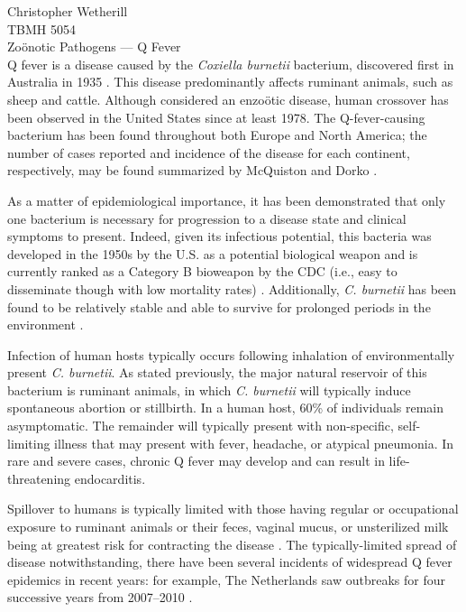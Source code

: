 \documentclass[11pt,letterpaper,final] {article}
\begin{document}

\noindent Christopher Wetherill \\
TBMH 5054 \\
Zo\"{o}notic Pathogens --- Q Fever \\[0.2cm]

Q fever is a disease caused by the \textit{Coxiella burnetii} bacterium, discovered first in Australia in 1935 \cite{Derrick:1937}. This disease predominantly affects ruminant animals, such as sheep and cattle. Although considered an enzo\"{o}tic disease, human crossover has been observed in the United States since at least 1978. The Q-fever-causing bacterium has been found throughout both Europe and North America; the number of cases reported and incidence of the disease for each continent, respectively, may be found summarized by McQuiston \citeyear{McQuiston:2006} and Dorko \citeyear{Dorko:2012}.

As a matter of epidemiological importance, it has been demonstrated that only one bacterium is necessary for progression to a disease state and clinical symptoms to present. Indeed, given its infectious potential, this bacteria was developed in the 1950s by the U.S. as a potential biological weapon and is currently ranked as a Category B bioweapon by the CDC (i.e., easy to disseminate though with low mortality rates) \cite{Madariaga:2003}. Additionally, \textit{C. burnetii} has been found to be relatively stable and able to survive for prolonged periods in the environment \cite{Roest:2013}.

Infection of human hosts typically occurs following inhalation of environmentally present \textit{C. burnetii}. As stated previously, the major natural reservoir of this bacterium is ruminant animals, in which \textit{C. burnetii} will typically induce spontaneous abortion or stillbirth. In a human host, 60\% of individuals remain asymptomatic. The remainder will typically present with non-specific, self-limiting illness that may present with fever, headache, or atypical pneumonia. In rare and severe cases, chronic Q fever may develop and can result in life-threatening endocarditis.

Spillover to humans is typically limited with those having regular or occupational exposure to ruminant animals or their feces, vaginal mucus, or unsterilized milk being at greatest risk for contracting the disease \cite{Roest:2013}. The typically-limited spread of disease notwithstanding, there have been several incidents of widespread Q fever epidemics in recent years: for example, The Netherlands saw outbreaks for four successive years from 2007--2010 \cite{Dijkstra:2012}.
\end{document}
